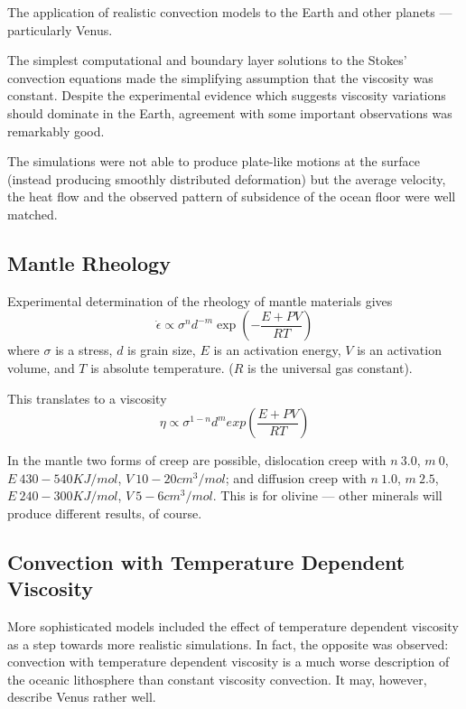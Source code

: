 \documentclass[10pt]{article}
\begin{document}
	
		The application of realistic convection models to the
		Earth and other planets — particularly Venus.
		
		The simplest computational and boundary layer solutions to the Stokes' convection
		equations made the simplifying assumption that the viscosity 
		was constant. Despite the experimental evidence which suggests viscosity 
		variations should dominate in the Earth, agreement with some 
		important observations was remarkably good.

		The simulations were not able to produce plate-like motions
		at the surface (instead producing smoothly distributed deformation) but
		the average velocity, the heat flow and the observed pattern of subsidence
		of the ocean floor were well matched.
		
		\subsection{Mantle Rheology}
		
			Experimental determination of the rheology of mantle materials
			gives 
				\begin{equation}
					\dot{\epsilon} \propto \sigma^n d^{-m} \exp\left( -\frac{E+PV}{RT} \right)
				\end{equation}
			where $\sigma$ is a stress, $d$ is grain size, $E$ is an activation energy, $V$ is
			an activation volume, and $T$ is absolute temperature. ($R$ is the universal gas
			constant).
			
			This translates to a viscosity
				\begin{equation}
					\eta \propto \sigma^{1-n} d^m exp\left( \frac{E+PV}{RT} \right)
				\end{equation}
		
			In the mantle two forms of creep are possible, dislocation creep with $n ~ 3.0$, $m~0$,
			$E ~ 430-540 KJ/mol$, $V ~ 10 - 20 cm^3/mol$; and diffusion creep with $n ~ 1.0$, $m~2.5$,
			$E ~ 240-300 KJ/mol$, $V ~ 5-6 cm^3/mol$. This is for olivine --- other minerals will 
			produce different results, of course.
			
		
		\subsection{Convection with Temperature Dependent Viscosity}

		More sophisticated models included the effect of temperature dependent 
		viscosity as a step towards more realistic simulations. In fact, the opposite was observed: 
		convection with temperature dependent viscosity is a much worse description of the 
		oceanic lithosphere than constant viscosity convection. It may, however, 
		describe Venus rather well.
\end{document}
